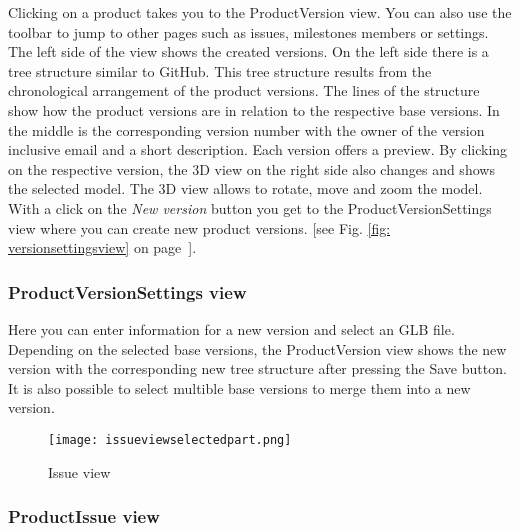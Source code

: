 Clicking on a product takes you to the ProductVersion view. You can also use the toolbar to jump to other pages such as issues, milestones members or settings. The left side of the view shows the created versions. On the left side there is a tree structure similar to GitHub. This tree structure results from the chronological arrangement of the product versions. The lines of the structure show how the product versions are in relation to the respective base versions. In the middle is the corresponding version number with the owner of the version inclusive email and a short description. Each version offers a preview. By clicking on the respective version, the 3D view on the right side also changes and shows the selected model. The 3D view allows to rotate, move and zoom the model. 
With a click on the \textit{New version} button you get to the ProductVersionSettings view where you can create new product versions. [see Fig. \ref{fig: versionsettingsview} on page~\pageref{fig: versionsettingsview}]. 

\subsubsection*{ProductVersionSettings view}

Here you can enter information for a new version and select an GLB file. Depending on the selected base versions, the ProductVersion view shows the new version with the corresponding new tree structure after pressing the Save button. It is also possible to select multible base versions to merge them into a new version.

\begin{wrapfigure}{r}{0.5\textwidth}
    \centering
    \texttt{[image: issueviewselectedpart.png]}
    \caption{Issue view}
    \label{fig: issueview}
\end{wrapfigure}

\subsubsection*{ProductIssue view}


